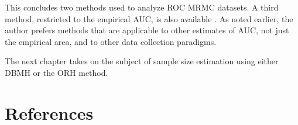 \documentclass[
]{book}
\begin{document}
This concludes two methods used to analyze ROC MRMC datasets. A third method, restricted to the empirical AUC, is also available \citep{RN2253, RN2254, RN2080, RN2081}. As noted earlier, the author prefers methods that are applicable to other estimates of AUC, not just the empirical area, and to other data collection paradigms.

The next chapter takes on the subject of sample size estimation using either DBMH or the ORH method.

\hypertarget{references}{%
\section{References}\label{references}}

  
\end{document}
